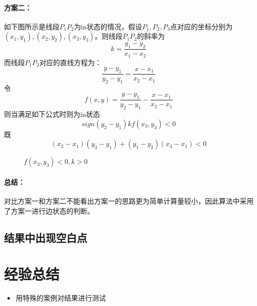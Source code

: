 \documentclass[10pt]{article}
\begin{document}
\paragraph{方案二：}
如下图所示是线段$P_1P_2$为in状态的情况，假设$P_1,P_2,P_3$点对应的坐标分别为$(x_1,y_1),(x_2,y_2),(x_3,y_3)$。则线段$P_1P_2$的斜率为
\begin{equation}
k=\frac{y_1-y_2}{x_1-x_2}
\end{equation}
而线段$P_1P_2$对应的直线方程为：
\begin{equation}
\frac{y-y_1}{y_2-y_1}=\frac{x-x_1}{x_2-x_1}
\end{equation}
令
\begin{equation}
f(x,y)=\frac{y-y_1}{y_2-y_1}-\frac{x-x_1}{x_2-x_1}
\end{equation}
则当满足如下公式时则为in状态
\begin{equation}
sign(y_2-y_1)kf(x_3,y_3)<0
\end{equation}
既
\begin{equation}
(x_2-x_1)(y_3-y_1)+(y_1-y_2)(x_3-x_1)<0
\end{equation}

\begin{figure}[H]
\begin{center}
\begin{minipage}[t]{0.45\linewidth}
\caption{$f(x_3,y_3)>0,k<0$}
\end{minipage}
\begin{minipage}[t]{0.45\linewidth}
\caption{$f(x_3,y_3)<0,k>0$}
\end{minipage}
\end{center}
\end{figure}
\paragraph{总结：}
对比方案一和方案二不能看出方案一的思路更为简单计算量较小，因此算法中采用了方案一进行边状态的判断。
\subsection{结果中出现空白点}

\section{经验总结}
\begin{itemize}
\item{用特殊的案例对结果进行测试}
\end{itemize}
\end{document}
